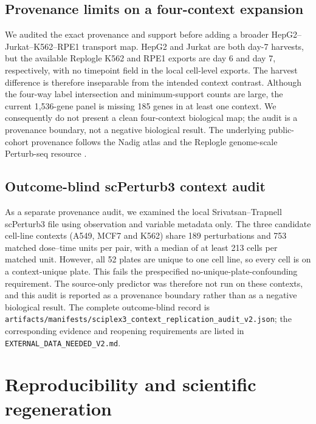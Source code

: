 \documentclass{article}
\begin{document}


\subsection{Provenance limits on a four-context expansion}

We audited the exact provenance and support before adding a broader
HepG2--Jurkat--K562--RPE1 transport map. HepG2 and Jurkat are both day-7
harvests, but the available Replogle K562 and RPE1 exports are day 6 and day 7,
respectively, with no timepoint field in the local cell-level exports. The
harvest difference is therefore inseparable from the intended context
contrast. Although the four-way label intersection and minimum-support counts
are large, the current 1,536-gene panel is missing 185 genes in at least one
context. We consequently do not present a clean four-context biological map;
the audit is a provenance boundary, not a negative biological result. The
underlying public-cohort provenance follows the Nadig atlas and the Replogle
genome-scale Perturb-seq resource \citep{nadig2025trade,replogle2022genome}.



\subsection{Outcome-blind scPerturb3 context audit}

As a separate provenance audit, we examined the local Srivatsan--Trapnell
scPerturb3 file using observation and variable metadata only. The three
candidate cell-line contexts (A549, MCF7 and K562) share 189 perturbations and
753 matched dose--time units per pair, with a median of at least 213 cells per
matched unit. However, all 52 plates are unique to one cell line, so every
cell is on a context-unique plate. This fails the prespecified
no-unique-plate-confounding requirement. The source-only predictor was
therefore not run on these contexts, and this audit is reported as a
provenance boundary rather than as a negative biological result. The complete
outcome-blind record is
\texttt{artifacts/manifests/sciplex3\_context\_replication\_audit\_v2.json};
the corresponding evidence and reopening requirements are listed in
\texttt{EXTERNAL\_DATA\_NEEDED\_V2.md}.

\FloatBarrier

\section{Reproducibility and scientific regeneration}
\label{app:reproducibility}
\end{document}
